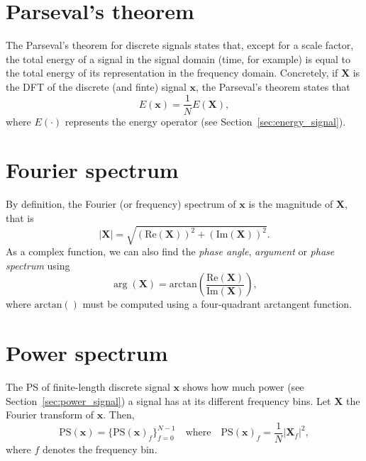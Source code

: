 
\section{Parseval's theorem}
\label{sec:parseval}

The Parseval's theorem for discrete signals states that, except for a
scale factor, the total energy of a signal in the signal domain (time,
for example) is equal to the total energy of its representation in the
frequency domain. Concretely, if $\mathbf{X}$ is the \gls{DFT} of the
discrete (and finte) signal $\bm{x}$, the Parseval’s theorem
states that
\begin{equation}
  E(\mathbf{x}) = \frac{1}{N}E(\mathbf{X}),
\end{equation}
where $E(\cdot)$ represents the energy operator (see
Section~\ref{sec:energy_signal}).


\section{Fourier spectrum}
\label{sec:Fourier_spectrum}

By definition, the Fourier
(or frequency) spectrum of $\bm{x}$ is the magnitude of
$\mathbf{X}$, that is
\begin{equation}
  |\mathbf{X}| = \sqrt{(\text{Re}(\mathbf{X}))^2+(\text{Im}(\mathbf{X}))^2}.
\end{equation}
As a complex function, we can also find the \emph{phase angle},
\emph{argument} or \emph{phase spectrum} using
\begin{equation}
  \arg({\mathbf{X}}) = \text{arctan}\left(\frac{\text{Re}(\mathbf{X})}{\text{Im}(\mathbf{X})}\right),
\end{equation}
where $\text{arctan}()$ must be computed using a four-quadrant
arctangent function.


\section{Power spectrum}
\label{sec:power_spectrum}

The \gls{PS} of finite-length discrete signal $\bm{x}$ shows how
much power (see Section~\ref{sec:power_signal}) a signal has at its
different frequency bins. Let $\mathbf{X}$ the Fourier transform of
$\bm{x}$. Then,
\begin{equation}
  \text{PS}(\bm{x}) = \{\text{PS}(\bm{x})_f\}_{f=0}^{N-1} \quad \text{where} \quad \text{PS}(\bm{x})_f = \frac{1}{N}|\mathbf{X}_f|^2,
\end{equation}
where $f$ denotes the frequency bin.

